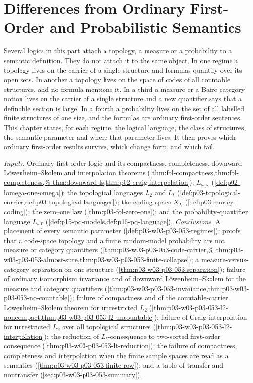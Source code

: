 \chapter{Differences from Ordinary First-Order and Probabilistic Semantics}
\label{sec:p03-w03-p03-053-differences}

Several logics in this part attach a topology, a measure or a probability
to a semantic definition. They do not attach it to the same object.
In one regime a topology lives on the carrier of a single structure and
formulas quantify over its open sets. In another a topology lives on the
space of codes of all countable structures, and no formula mentions it.
In a third a measure or a Baire category notion lives on the carrier of a
single structure and a new quantifier says that a definable section is
large. In a fourth a probability lives on the set of all labelled finite
structures of one size, and the formulas are ordinary first-order
sentences. This chapter states, for each regime, the logical language,
the class of structures, the semantic parameter and where that parameter
lives. It then proves which ordinary first-order results survive, which
change form, and which fail.

\emph{Inputs.} Ordinary first-order logic and its compactness,
completeness, downward L\"owenheim--Skolem and interpolation theorems
(\cref{thm:fol-compactness,thm:fol-completeness,%
thm:downward-ls,thm:p02-craig-interpolation});
\(L_{\omega_1\omega}\) (\cref{def:p02-lomega-one-omega});
the topological languages \(L_2\) and \(L_t\)
(\cref{def:p03-topological-carrier,def:p03-topological-languages});
the coding space \(X_L\) (\cref{def:p03-morley-coding});
the zero--one law (\cref{thm:p03-fol-zero-one});
and the probability-quantifier language \(L_{\omega P}\)
(\cref{def:p15-pq-models,def:p15-pq-language}).
\emph{Conclusions.} A placement of every semantic parameter
(\cref{def:p03-w03-p03-053-regimes}); proofs that a code-space topology
and a finite random-model probability are not measure or category
quantifiers (\cref{thm:p03-w03-p03-053-code-carrier,%
thm:p03-w03-p03-053-almost-sure,thm:p03-w03-p03-053-finite-collapse});
a measure-versus-category separation on one structure
(\cref{thm:p03-w03-p03-053-separation}); failure of ordinary isomorphism
invariance and of downward L\"owenheim--Skolem for the measure and
category quantifiers
(\cref{thm:p03-w03-p03-053-invariance,thm:p03-w03-p03-053-no-countable});
failure of compactness and of the countable-carrier
L\"owenheim--Skolem theorem for unrestricted \(L_2\)
(\cref{thm:p03-w03-p03-053-l2-noncompact,thm:p03-w03-p03-053-l2-uncountable});
failure of Craig interpolation for unrestricted \(L_2\) over all
topological structures (\cref{thm:p03-w03-p03-053-l2-interpolation});
the reduction of \(L_t\)-consequence to two-sorted first-order
consequence (\cref{thm:p03-w03-p03-053-lt-reduction}); the failure of
compactness, completeness and interpolation when the finite sample spaces
are read as a semantics (\cref{thm:p03-w03-p03-053-finite-row}); and a
table of transfer and nontransfer (\cref{sec:p03-w03-p03-053-summary}).

